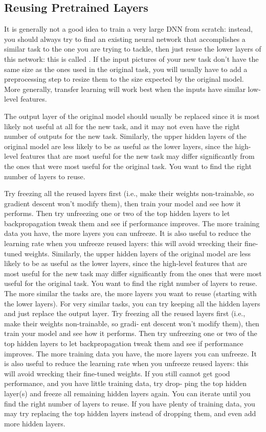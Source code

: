 \subsection{Reusing Pretrained Layers}
It is generally not a good idea to train a very large DNN from scratch: instead, you should always try to find an existing neural network that accomplishes a similar task to the one you are trying to tackle, then just reuse the lower layers of this network: this is called . If the input pictures of your new task don't have the same size as the ones used in the original task, you will usually have to add a preprocessing step to resize them to the size expected by the original model. More generally, transfer learning will work best when the inputs have similar low-level features.

The output layer of the original model should usually be replaced since it is most likely not useful at all for the new task, and it may not even have the right number of outputs for the new task. Similarly, the upper hidden layers of the original model are less likely to be as useful as the lower layers, since the high-level features that are most useful for the new task may differ significantly from the ones that were most useful for the original task. You want to find the right number of layers to reuse.

Try freezing all the reused layers first (i.e., make their weights non-trainable, so gradient descent won't modify them), then train your model and see how it performs. Then try unfreezing one or two of the top hidden layers to let backpropagation tweak them and see if performance improves. The more training data you have, the more layers you can unfreeze. It is also useful to reduce the learning rate when you unfreeze reused layers: this will avoid wrecking their fine-tuned weights. 
Similarly, the upper hidden layers of the original model are less likely to be as useful as the lower layers, since the high-level features that are most useful for the new task may differ significantly from the ones that were most useful for the original task. You want to find the right number of layers to reuse.
The more similar the tasks are, the more layers you want to reuse (starting with the lower layers). For very similar tasks, you can try keeping all the hidden layers and just replace the output layer.
Try freezing all the reused layers first (i.e., make their weights non-trainable, so gradi‐ ent descent won’t modify them), then train your model and see how it performs. Then try unfreezing one or two of the top hidden layers to let backpropagation tweak them and see if performance improves. The more training data you have, the more layers you can unfreeze. It is also useful to reduce the learning rate when you unfreeze reused layers: this will avoid wrecking their fine-tuned weights.
If you still cannot get good performance, and you have little training data, try drop‐ ping the top hidden layer(s) and freeze all remaining hidden layers again. You can iterate until you find the right number of layers to reuse. If you have plenty of training data, you may try replacing the top hidden layers instead of dropping them, and even add more hidden layers.

